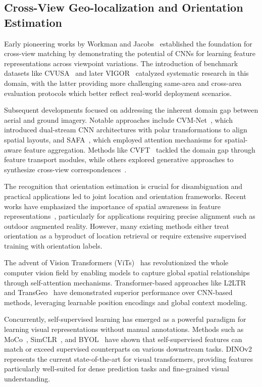 \documentclass{bmvc2k}
\begin{document}
\subsection{Cross-View Geo-localization and Orientation Estimation}

Early pioneering works by Workman and Jacobs~\cite{workman2015predicting,workman2015learning} established the foundation for cross-view matching by demonstrating the potential of CNNs for learning feature representations across viewpoint variations. The introduction of benchmark datasets like CVUSA~\cite{workman2015predicting} and later VIGOR~\cite{zhu2021vigor} catalyzed systematic research in this domain, with the latter providing more challenging same-area and cross-area evaluation protocols which better reflect real-world deployment scenarios.

Subsequent developments focused on addressing the inherent domain gap between aerial and ground imagery. Notable approaches include CVM-Net~\cite{hu2018cvm}, which introduced dual-stream CNN architectures with polar transformations to align spatial layouts, and SAFA~\cite{NEURIPS2019_ba2f0015}, which employed attention mechanisms for spatial-aware feature aggregation. Methods like CVFT~\cite{shi2019optimalfeaturetransportcrossview} tackled the domain gap through feature transport modules, while others explored generative approaches to synthesize cross-view correspondences~\cite{regmi2018cross}.

The recognition that orientation estimation is crucial for disambiguation and practical applications led to joint location and orientation frameworks. Recent works have emphasized the importance of spatial awareness in feature representations~\cite{shi2020ilookingatjoint}, particularly for applications requiring precise alignment such as outdoor augmented reality. However, many existing methods either treat orientation as a byproduct of location retrieval or require extensive supervised training with orientation labels.

The advent of Vision Transformers (ViTs)~\cite{dosovitskiy2020image} has revolutionized the whole computer vision field by enabling models to capture global spatial relationships through self-attention mechanisms. Transformer-based approaches like L2LTR~\cite{yang2021cross} and TransGeo~\cite{wang2021multi} have demonstrated superior performance over CNN-based methods, leveraging learnable position encodings and global context modeling.

Concurrently, self-supervised learning has emerged as a powerful paradigm for learning visual representations without manual annotations. Methods such as MoCo~\cite{he2020momentum}, SimCLR~\cite{chen2020simple}, and BYOL~\cite{grill2020bootstrap} have shown that self-supervised features can match or exceed supervised counterparts on various downstream tasks. DINOv2~\cite{oquab2023dinov2} represents the current state-of-the-art for visual transformers, providing features particularly well-suited for dense prediction tasks and fine-grained visual understanding.
\end{document}
